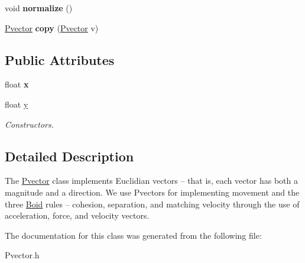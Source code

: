 \begin{DoxyCompactItemize}
\item 
void {\bfseries normalize} ()\hypertarget{class_pvector_af21ee637474eff3c3387a7b7d138004a}{}\label{class_pvector_af21ee637474eff3c3387a7b7d138004a}

\item 
\hyperlink{class_pvector}{Pvector} {\bfseries copy} (\hyperlink{class_pvector}{Pvector} v)\hypertarget{class_pvector_af5e109a5f1261c4ee69b6f213d7d6154}{}\label{class_pvector_af5e109a5f1261c4ee69b6f213d7d6154}

\end{DoxyCompactItemize}
\subsection*{Public Attributes}
\begin{DoxyCompactItemize}
\item 
float {\bfseries x}\hypertarget{class_pvector_a7ba0ffff299fbf5e127d1849a9c5c87a}{}\label{class_pvector_a7ba0ffff299fbf5e127d1849a9c5c87a}

\item 
float \hyperlink{class_pvector_ab9d5ab87022aa781382b8eb4b944b375}{y}\hypertarget{class_pvector_ab9d5ab87022aa781382b8eb4b944b375}{}\label{class_pvector_ab9d5ab87022aa781382b8eb4b944b375}

\begin{DoxyCompactList}\small\item\em Constructors. \end{DoxyCompactList}\end{DoxyCompactItemize}


\subsection{Detailed Description}
The \hyperlink{class_pvector}{Pvector} class implements Euclidian vectors -- that is, each vector has both a magnitude and a direction. We use Pvectors for implementing movement and the three \hyperlink{class_boid}{Boid} rules -- cohesion, separation, and matching velocity through the use of acceleration, force, and velocity vectors. 

The documentation for this class was generated from the following file\+:\begin{DoxyCompactItemize}
\item 
Pvector.\+h\end{DoxyCompactItemize}
